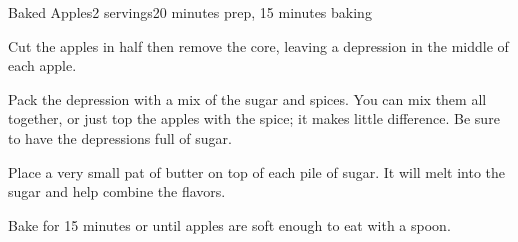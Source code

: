 \documentclass[../Cookbook.tex]{subfiles}
\begin{document}
\begin{recipe}{Baked Apples}{2 servings}{20 minutes prep, 15 minutes baking}


	Cut the apples in half then remove the core, leaving a depression in the middle of each apple.

	Pack the depression with a mix of the sugar and spices. You can mix them all together, or just top the apples with the spice; it makes little difference. Be sure to have the depressions full of sugar.

	Place a very small pat of butter on top of each pile of sugar. It will melt into the sugar and help combine the flavors.

	Bake for 15 minutes or until apples are soft enough to eat with a spoon.

\end{recipe}
\end{document}
